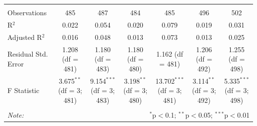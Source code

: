 \documentclass{article}
\begin{document}
\begin{landscape}
\begin{table}[!htbp]
\begin{tabular}{@{\extracolsep{5pt}}lcccccc}
\hline \\[-1.8ex] 
Observations & 485 & 487 & 484 & 485 & 496 & 502 \\ 
R$^{2}$ & 0.022 & 0.054 & 0.020 & 0.079 & 0.019 & 0.031 \\ 
Adjusted R$^{2}$ & 0.016 & 0.048 & 0.013 & 0.073 & 0.013 & 0.025 \\ 
Residual Std. Error & 1.208 (df = 481) & 1.180 (df = 483) & 1.180 (df = 480) & 1.162 (df = 481) & 1.206 (df = 492) & 1.255 (df = 498) \\ 
F Statistic & 3.675$^{**}$ (df = 3; 481) & 9.154$^{***}$ (df = 3; 483) & 3.198$^{**}$ (df = 3; 480) & 13.702$^{***}$ (df = 3; 481) & 3.114$^{**}$ (df = 3; 492) & 5.335$^{***}$ (df = 3; 498) \\ 
\hline 
\hline \\[-1.8ex] 
\textit{Note:}  & \multicolumn{6}{r}{$^{*}$p$<$0.1; $^{**}$p$<$0.05; $^{***}$p$<$0.01} \\ 
\end{tabular} 
\end{table} 
\end{landscape}
\end{document}
